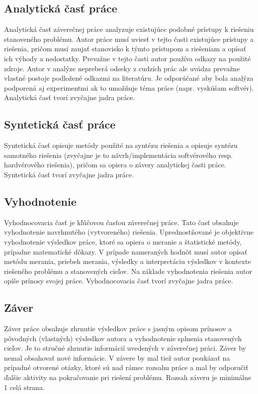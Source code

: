 \subsection{Analytická časť práce}

Analytická časť záverečnej práce analyzuje existujúce podobné prístupy k riešeniu stanoveného problému. Autor práce musí uviesť v tejto časti existujúce prístupy a riešenia, pričom musí zaujať stanovisko k týmto prístupom a riešeniam a opísať ich výhody a nedostatky. Prevažne v tejto časti autor používa odkazy na použité zdroje. Autor v analýze nepreberá odseky z cudzích prác ale uvádza prevažne vlastné postoje podložené odkazmi na literatúru. Je odporúčané aby bola analýza podporená aj experimentmi ak to umožňuje téma práce (napr. vyskúšam softvér). Analytická časť tvorí zvyčajne  jadra práce.

\subsection{Syntetická časť práce}

Syntetická časť opisuje metódy použité na syntézu riešenia a opisuje syntézu samotného riešenia (zvyčajne je to návrh/implementácia softvérového resp. hardvérového riešenia), pričom sa opiera o závery analytickej časti práce. Syntetická časť tvorí zvyčajne  jadra práce.

\subsection{Vyhodnotenie}

Vyhodnocovacia časť je kľúčovou časťou záverečnej práce. Tato časť obsahuje vyhodnotenie navrhnutého (vytvoreného) riešenia. Uprednostňované je objektívne vyhodnotenie výsledkov práce, ktoré sa opiera o meranie a štatistické metódy, prípadne matematické dôkazy. V prípade nameraných hodnôt musí autor opísať metódu merania, priebeh merania, výsledky a interpretáciu výsledkov v kontexte riešeného problému a stanovených cieľov. Na základe vyhodnotenia riešenia autor opíše prínosy svojej práce. Vyhodnocovacia časť tvorí zvyčajne  jadra práce.

\subsection{Záver}

Záver práce obsahuje zhrnutie výsledkov práce s jasným opisom prínosov a pôvodných (vlastných) výsledkov autora a vyhodnotenie splnenia stanovených cieľov. Je to stručné zhrnutie informácií uvedených v záverečnej práci. Záver by nemal obsahovať nové informácie. V závere by mal tiež autor poukázať na prípadné otvorené otázky, ktoré sú nad rámec rozsahu práce a mal by odporučiť ďalšie aktivity na pokračovanie pri riešení problému. Rozsah záveru je minimálne 1 celá strana.


